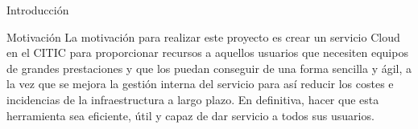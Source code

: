 \begin{chapter}{Introducción}





\begin{section}{Motivación}
La motivación para realizar este proyecto es crear un servicio Cloud en el CITIC para proporcionar recursos a aquellos usuarios que necesiten equipos de grandes prestaciones y que los puedan conseguir de una forma sencilla y ágil, a la vez que se mejora la gestión interna del servicio para así reducir los costes e incidencias de la infraestructura a largo plazo. En definitiva, hacer que esta herramienta sea eficiente, útil y capaz de dar servicio a todos sus usuarios.
\end{section}


\end{chapter}

